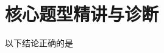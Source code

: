 \documentclass[11pt,a4paper]{ctexart}
\begin{document}
\section{核心题型精讲与诊断}


\begin{minipage}[t]{0.7\textwidth}
  \vspace{0pt}
  \qOneStem 以下结论正确的是 \blank{1.5cm}
  \qOneOptions
\end{minipage}
\hfill
\begin{minipage}[t]{0.26\textwidth}
  \vspace{0pt}
  \hfill
  \qOneFigure[0.95]
\end{minipage}

\vspace{0.8em}
\end{document}
